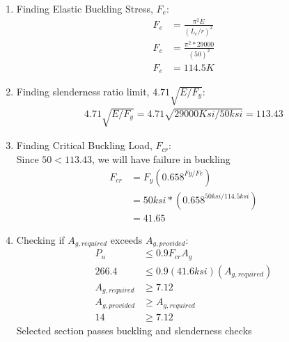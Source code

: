 \documentclass{report} %
\begin{document}
\begin{enumerate}
    \item Finding Elastic Buckling Stress, $F_e$:
        \begin{equation*}
            \begin{aligned}
                F_e &= \frac{\pi^2E}{(L_c/r)^2} \\
                F_e &= \frac{\pi^2*29000}{(50)^2} \\
                F_e &= 114.5K
            \end{aligned}
        \end{equation*}
    \item Finding slenderness ratio limit, $4.71\sqrt{E/F_y}$:
        \begin{equation*}
            \begin{aligned}
                4.71\sqrt{E/F_y} = 4.71\sqrt{29000Ksi/50ksi} = 113.43 
            \end{aligned}
        \end{equation*}
    \item Finding Critical Buckling Load, $F_{cr}$: \\
        Since $50 < 113.43$, we will have failure in buckling 
        \begin{equation*}
            \begin{aligned}
                F_{cr} &= F_y(0.658^{Fy/Fe}) \\
                        &= 50ksi * (0.658^{50ksi/114.5ksi}) \\
                        &= 41.65
            \end{aligned}
        \end{equation*}
    \item Checking if $A_{g,required}$ exceeds $A_{g,provided}$:
        \begin{equation*}
            \begin{aligned}
                P_u &\leq 0.9F_{cr}A_g \\
                266.4 &\leq 0.9(41.6ksi)(A_{g,required}) \\
                A_{g,required} &\geq 7.12 \\
                A_{g,provided} &\geq A_{g,required} \\
                14 &\geq 7.12 
            \end{aligned}
        \end{equation*}
        Selected section passes buckling and slenderness checks
\end{enumerate}
\end{document}

